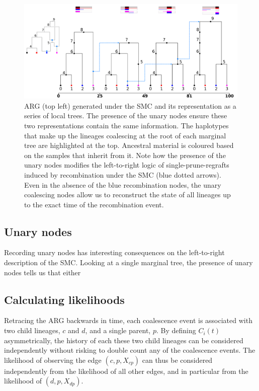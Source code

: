 \documentclass{article}
\begin{document}
\begin{figure}[!ht]
\centering
\includegraphics[width=\textwidth]{figures/smc-custom-haplotypes-mini.png}
\caption{ARG (top left) generated under the SMC and its representation as a 
series of local trees. The presence of the unary nodes ensure these two 
representations contain the same information.
The haplotypes that make up the lineages coalescing 
at the root of each marginal tree are highlighted at the top. Ancestral 
material is coloured based on the samples that inherit from it.
Note how the presence of the unary nodes 
modifies the left-to-right logic of single-prune-regrafts induced by 
recombination under the SMC (blue dotted arrows).
Even in the absence of the blue recombination nodes, 
the unary coalescing nodes allow us to reconstruct the state of all lineages 
up to the exact time of the recombination event.
}
\label{fig:smc-unary}
\end{figure}

\subsection{Unary nodes} \label{par:unary}
Recording unary nodes has interesting consequences on the left-to-right 
description of the SMC. Looking at a single marginal tree, the presence of 
unary nodes tells us that either \\



\subsection{Calculating likelihoods} \label{par:liks}

Retracing the ARG backwards in time, each coalescence event is associated with two child 
lineages, $c$ and $d$, and a single parent, $p$. By defining $C_i(t)$ asymmetrically, 
the history of each these two child lineages can be considered independently without 
risking to double count any of the coalescence events. The likelihood of 
observing the edge $(c, p, X_{cp})$ can thus be considered independently from 
the likelihood of all other edges, and in particular from the likelihood 
of $(d, p, X_{dp})$.\\
\end{document}
